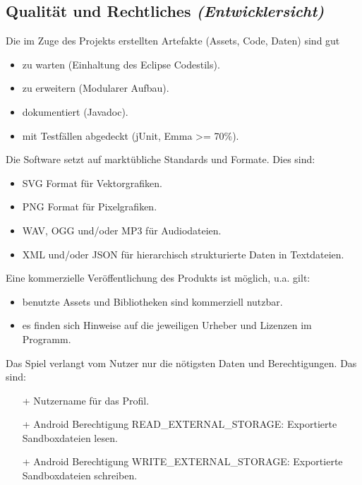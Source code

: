 \subsection{Qualität und Rechtliches \textit{(Entwicklersicht)}}
\begin{requirements}
	 Die im Zuge des Projekts erstellten Artefakte (Assets, Code, Daten) sind gut
		\begin{itemize}
			\item zu warten (Einhaltung des Eclipse Codestils).
			\item zu erweitern (Modularer Aufbau).
			\item dokumentiert (Javadoc).
			\item mit Testfällen abgedeckt (jUnit, Emma >= 70\%).
		\end{itemize}
	 Die Software setzt auf marktübliche Standards und Formate. Dies sind:
		\begin{itemize}
			\item SVG Format für Vektorgrafiken.
			\item PNG Format für Pixelgrafiken.
			\item WAV, OGG und/oder MP3 für Audiodateien.
			\item XML und/oder JSON für hierarchisch strukturierte Daten in Textdateien.
		\end{itemize}
	 Eine kommerzielle Veröffentlichung des Produkts ist möglich, u.a. gilt:
		\begin{itemize}
			\item benutzte Assets und Bibliotheken sind kommerziell nutzbar.
			\item es finden sich Hinweise auf die jeweiligen Urheber und Lizenzen im Programm.
		\end{itemize}
	 Das Spiel verlangt vom Nutzer nur die nötigsten Daten und Berechtigungen. Das sind:
		\begin{itemize}
			\item [+] Nutzername für das Profil.
			\item [+] Android Berechtigung READ\_EXTERNAL\_STORAGE: Exportierte Sandboxdateien lesen.
			\item [+] Android Berechtigung WRITE\_EXTERNAL\_STORAGE: Exportierte Sandboxdateien schreiben.
		\end{itemize}
\end{requirements}
